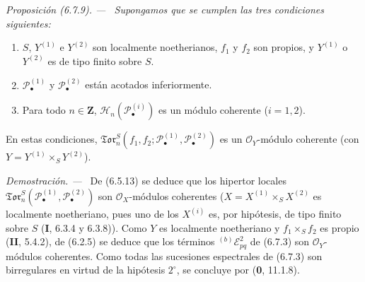 \documentclass[10pt,oneside]{book}
\newenvironment{proposition}[1][]{\par\medskip\noindent\itshape Proposición (#1). ---\ }{\par}
\newenvironment{proof}{\par\medskip\noindent\textit{Demostración. ---\ }}{\par}
\begin{document}
\begin{proposition}[6.7.9]
\label{III.6.7.9}
Supongamos que se cumplen las tres condiciones siguientes:
\begin{enumerate}
  \item[{$1^\circ$}]
    $S$, $Y^{(1)}$ e $Y^{(2)}$ son localmente noetherianos, $f_1$ y $f_2$
    son propios, y $Y^{(1)}$ o $Y^{(2)}$ es de tipo finito sobre $S$.
  \item[{$2^\circ$}]
    $\mathscr P_\bullet^{(1)}$ y $\mathscr P_\bullet^{(2)}$ están acotados
    inferiormente.
  \item[{$3^\circ$}]
    Para todo $n\in\mathbf Z$,
    $\mathscr H_n(\mathscr P_\bullet^{(i)})$ es un módulo coherente
    ($i=1,2$).
\end{enumerate}
En estas condiciones,
$\mathfrak{Tor}_n^S
(f_1,f_2;\mathscr P_\bullet^{(1)},\mathscr P_\bullet^{(2)})$ es un
$\mathscr O_Y$-módulo coherente (con
$Y=Y^{(1)}\times_S Y^{(2)}$).
\end{proposition}

\begin{proof}
De (6.5.13) se deduce que los hipertor locales
$\mathfrak{Tor}_n^S(\mathscr P_\bullet^{(1)},\mathscr P_\bullet^{(2)})$ son
$\mathscr O_X$-módulos coherentes
($X=X^{(1)}\times_S X^{(2)}$ es localmente noetheriano, pues uno de los
$X^{(i)}$ es, por hipótesis, de tipo finito sobre $S$ (\textbf I, 6.3.4 y 6.3.8)).
Como $Y$ es localmente noetheriano y $f_1\times_S f_2$ es propio
(\textbf{II}, 5.4.2), de (6.2.5) se deduce que los términos
${}^{(b)}\mathscr E_{pq}^2$ de (6.7.3) son $\mathscr O_Y$-módulos coherentes.
Como todas las sucesiones espectrales de (6.7.3) son birregulares en virtud
de la hipótesis $2^\circ$, se concluye por (\textbf{0}, 11.1.8).
\end{proof}
\end{document}
